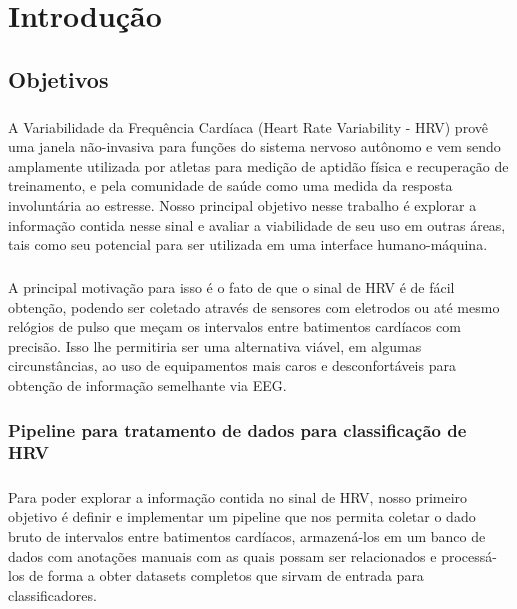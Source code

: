 \chapter{Introdução} 
\label{intro}


    \section{Objetivos}
    \label{goals}
    
        \paragraph{} A Variabilidade da Frequência Cardíaca (Heart Rate Variability - HRV) provê uma janela não-invasiva para funções do sistema nervoso autônomo e vem sendo amplamente utilizada por atletas para medição de aptidão física e recuperação de treinamento, e pela comunidade de saúde como uma medida da resposta involuntária ao estresse. Nosso principal objetivo nesse trabalho é explorar a informação contida nesse sinal e avaliar a viabilidade de seu uso em outras áreas, tais como seu potencial para ser utilizada em uma interface humano-máquina. 
        
        \paragraph{} A principal motivação para isso é o fato de que o sinal de HRV é de fácil obtenção, podendo ser coletado através de sensores com eletrodos ou até mesmo relógios de pulso que meçam os intervalos entre batimentos cardíacos com precisão. Isso lhe permitiria ser uma alternativa viável, em algumas circunstâncias, ao uso de equipamentos mais caros e desconfortáveis para obtenção de informação semelhante via EEG.
        
        \subsection{Pipeline para tratamento de dados para classificação de HRV}
        
            \paragraph{} Para poder explorar a informação contida no sinal de HRV, nosso primeiro objetivo é definir e implementar um pipeline que nos permita coletar o dado bruto de intervalos entre batimentos cardíacos, armazená-los em um banco de dados com anotações manuais com as quais possam ser relacionados e processá-los de forma a obter datasets completos que sirvam de entrada para classificadores. 
